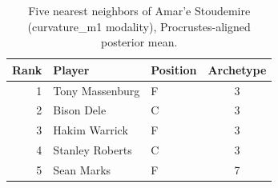 \begin{table}[htbp]
  \centering\small
  \begin{tabular}{rllc}
    \toprule
    Rank & Player & Position & Archetype \\
    \midrule
    1 & Tony Massenburg & F & 3 \\
    2 & Bison Dele & C & 3 \\
    3 & Hakim Warrick & F & 3 \\
    4 & Stanley Roberts & C & 3 \\
    5 & Sean Marks & F & 7 \\
    \bottomrule
  \end{tabular}
  \caption{Five nearest neighbors of Amar'e Stoudemire (curvature_m1 modality), Procrustes-aligned posterior mean.}
  \label{tab:Amar_e_Stoudemire_neighbors_curvature_m1}
\end{table}

